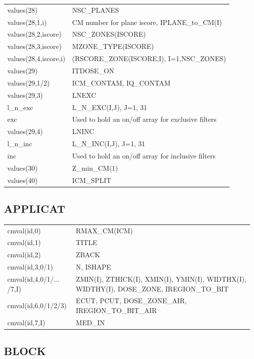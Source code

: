 \documentclass[12pt]{book}
\begin{document}
\noindent
\begin{tabular}{|p{4.5cm}|p{11.5cm}|}\hline
values(28) & NSC\_PLANES\\
values(28,1,i) & CM number for plane iscore, IPLANE\_to\_CM(I) \\
values(28,2,iscore) & NSC\_ZONES(ISCORE)\\
values(28,3,iscore) & MZONE\_TYPE(ISCORE)\\
values(28,4,iscore,i) & (RSCORE\_ZONE(ISCORE,I), I=1,NSC\_ZONES)\\
values(29) & ITDOSE\_ON \\
values(29,1/2) &      ICM\_CONTAM, IQ\_CONTAM \\
values(29,3) & LNEXC \\
l\_n\_exc & L\_N\_EXC(I,J), J=1, 31\\
exc & Used to hold an on/off array for exclusive filters \\
values(29,4) & LNINC \\
l\_n\_inc & L\_N\_INC(I,J), J=1, 31\\
inc & Used to hold an on/off array for inclusive filters \\
values(30) & Z\_min\_CM(1) \\
values(40) & ICM\_SPLIT \\ \hline
\end{tabular}

\subsection{APPLICAT}

\begin{tabular}{|p{4.5cm}|p{11.5cm}|}\hline
cmval(id,0) & RMAX\_CM(ICM)\\
cmval(id,1) & TITLE \\
cmval(id,2) & ZBACK \\
cmval(id,3,0/1) & N, ISHAPE \\
cmval(id,4,0/1/$\ldots$/7,I) & ZMIN(I), ZTHICK(I), XMIN(I),
       YMIN(I), WIDTHX(I), WIDTHY(I), DOSE\_ZONE, IREGION\_TO\_BIT  \\
cmval(id,6,0/1/2/3) & ECUT, PCUT, DOSE\_ZONE\_AIR, IREGION\_TO\_BIT\_AIR \\
cmval(id,7,I) & MED\_IN \\ \hline
\end{tabular}

\subsection{BLOCK}
\end{document}
